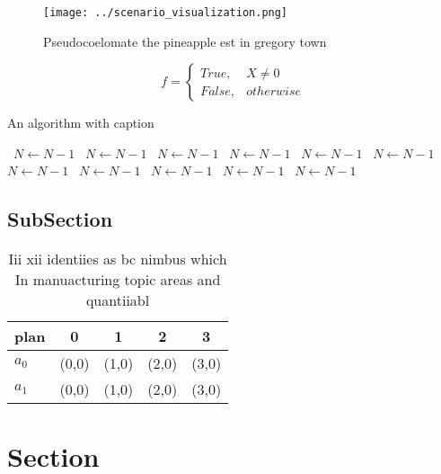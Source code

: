 \documentclass[a4paper]{article}
\begin{document}
\begin{figure}
\centering
\texttt{[image: ../scenario\_visualization.png]}
\caption{Pseudocoelomate the pineapple est in gregory town
}
\end{figure}
 
\begin{equation}   f =
\begin{cases} True, & X \neq 0\\
False, & otherwise
\end{cases}
\end{equation}

\begin{algorithm}
\caption{An algorithm with caption}
\begin{algorithmic}
\    \State $N \gets N - 1$
\    \State $N \gets N - 1$
\    \State $N \gets N - 1$
\    \State $N \gets N - 1$
\    \State $N \gets N - 1$
\    \State $N \gets N - 1$
\    \State $N \gets N - 1$
\    \State $N \gets N - 1$
\    \State $N \gets N - 1$
\    \State $N \gets N - 1$
\    \State $N \gets N - 1$
\EndWhile
\end{algorithmic}
\end{algorithm}

\subsection{SubSection}

\begin{table}
\begin{adjustbox}{width=0.5\columnwidth}
\begin{tabular}{|l|l|l|l|l|}
\hline
\textbf{plan} & \multicolumn{1}{c|}{\textbf{0}} & \multicolumn{1}{c|}{\textbf{1}} & \multicolumn{1}{c|}{\textbf{2}} & \multicolumn{1}{c|}{\textbf{3}} \\ \hline
\textbf{$a_0$}  & (0,0) & (1,0) & (2,0) & (3,0) \\ \hline
\textbf{$a_1$}  & (0,0) & (1,0) & (2,0) & (3,0) \\ \hline
\end{tabular}
\end{adjustbox}
\caption{Iii xii identiies as bc nimbus which In manuacturing topic areas and quantiiabl
}
\end{table}

\section{Section}
\end{document}
